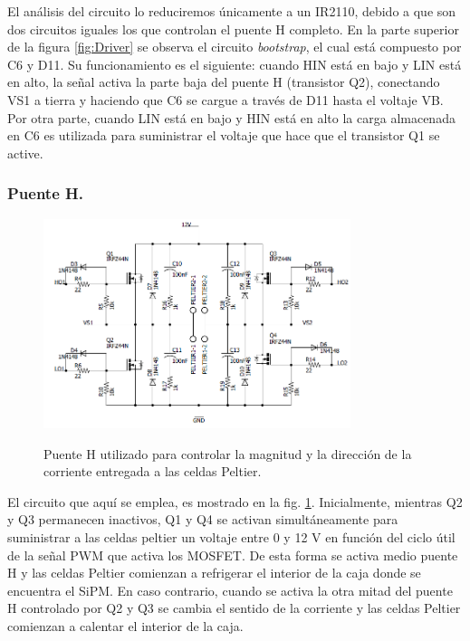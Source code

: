 El análisis del circuito  lo reduciremos únicamente a un IR2110, debido a que son dos circuitos iguales los que controlan el puente H completo. En la parte superior de la figura \ref{fig:Driver} se observa el circuito \textit{bootstrap}, el cual está compuesto por C6 y D11. Su funcionamiento es el siguiente: cuando HIN está en bajo y LIN está en alto, la señal activa la parte baja del puente H (transistor Q2), conectando VS1 a tierra y haciendo que C6 se cargue a través de D11 hasta el voltaje VB. Por otra parte, cuando LIN está en bajo y HIN está en alto la carga almacenada en C6 es utilizada para suministrar el voltaje que hace que el transistor Q1 se active.\\
\subsubsection{Puente H.}
\begin{figure}[h!]
\begin{centering}
    \caption{Puente H utilizado para controlar la magnitud y la  dirección de la corriente entregada a las celdas Peltier.}
    \includegraphics[width=0.8\textwidth]{Images/PuenteH.png}
    \label{fig:PuenteH}
  \par\end{centering}
\end{figure}
El circuito que aquí se emplea, es mostrado en la fig.  \ref{fig:PuenteH}. Inicialmente, mientras Q2  y Q3 permanecen inactivos, Q1 y Q4 se activan simultáneamente para suministrar a las celdas peltier un voltaje entre 0 y 12 V en función del ciclo útil de la señal PWM que activa los MOSFET. De esta forma se activa medio puente H y las celdas Peltier comienzan a refrigerar el interior de la caja donde se encuentra el SiPM. En caso contrario, cuando se activa la otra mitad del puente H controlado por Q2 y Q3 se cambia el sentido de la corriente y las celdas Peltier comienzan a calentar el interior de la caja.\\ \\
